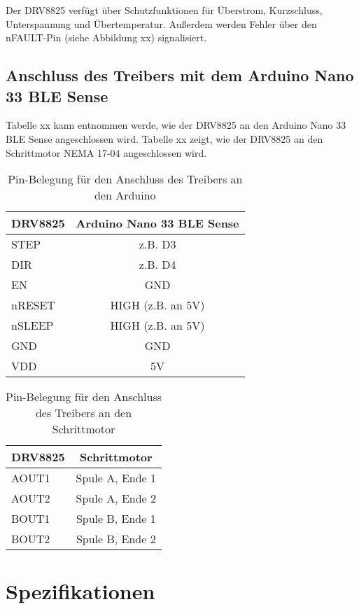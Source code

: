 Der DRV8825 verfügt über Schutzfunktionen für Überstrom, Kurzschluss, Unterspannung und Übertemperatur. Außerdem werden Fehler über den nFAULT-Pin (siehe Abbildung xx) signalisiert. 

\subsection{Anschluss des Treibers mit dem Arduino Nano 33 BLE Sense}

Tabelle xx kann entnommen werde, wie der DRV8825 an den Arduino Nano 33 BLE Sense angeschlossen wird. Tabelle xx zeigt, wie der DRV8825 an den Schrittmotor NEMA 17-04 angeschlossen wird. 

\begin{table}[htpb]
	\centering
	\begin{tabular}{|l|c|}
		\hline
		\textbf{DRV8825} & \textbf{Arduino Nano 33 BLE Sense} \\
		\hline
		STEP & z.B. D3 \\
		DIR & z.B. D4 \\
		EN & GND \\
		nRESET & HIGH (z.B. an 5V) \\
		nSLEEP & HIGH (z.B. an 5V) \\
		GND & GND \\
		VDD & 5V \\
		\hline
	\end{tabular}
	\caption{Pin-Belegung für den Anschluss des Treibers an den Arduino}
	\label{tab:PinDRV8825-Arduino}
\end{table}

\begin{table}[htpb]
	\centering
	\begin{tabular}{|l|c|}
		\hline
		\textbf{DRV8825} & \textbf{Schrittmotor} \\
		\hline
		AOUT1 & Spule A, Ende 1 \\
		AOUT2 & Spule A, Ende 2 \\
		BOUT1 & Spule B, Ende 1 \\
		BOUT2 & Spule B, Ende 2 \\
		\hline
	\end{tabular}
	\caption{Pin-Belegung für den Anschluss des Treibers an den Schrittmotor}
	\label{tab:PinDRV8825-Motor}
\end{table}

\section{Spezifikationen}

